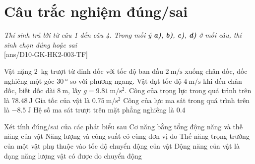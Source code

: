 \section{Câu trắc nghiệm đúng/sai} 
\textit{Thí sinh trả lời từ câu 1 đến câu 4. Trong mỗi ý \textbf{a)}, \textbf{b)}, \textbf{c)}, \textbf{d)} ở mỗi câu, thí sinh chọn đúng hoặc sai}
\setcounter{ex}{0}\\
[ans/D10-GK-HK2-003-TF]
\begin{ex}
	Vật nặng \SI{2}{\kilogram} trượt từ đỉnh dốc với tốc độ ban đầu $\SI{2}{\meter / \second}$ xuống chân dốc, dốc nghiêng một góc $\SI{30}{\degree}$ so với phương ngang. Vật đạt tốc độ $\SI{4}{\meter / \second}$ khi đến chân dốc, biết dốc dài $\SI{8}{\meter}$, lấy $g=\SI{9.81}{\meter / \second \squared}$.
	\choiceTF
	{\True Công của trọng lực trong quá trình trên là $\SI{78.48}{\joule}$}
	{\True Gia tốc của vật là $\SI{0.75}{\meter / \second \squared}$}
	{Công của lực ma sát trong quá trình trên là $\SI{-8.5}{\joule}$}
	{Hệ số ma sát trượt trên mặt phẳng nghiêng là $\SI{0.4}{}$}
\end{ex}
\begin{ex}
	Xét tính đúng/sai của các phát biểu sau
	\choiceTF
	{\True Cơ năng bằng tổng động năng và thế năng của vật}
	{Năng lượng và công suất có cùng đơn vị đo}
	{Thế năng trọng trường của một vật phụ thuộc vào tốc độ chuyển động của vật}
	{\True Động năng của vật là dạng năng lượng vật có được do chuyển động}
	\loigiai{
		
	}
\end{ex}

